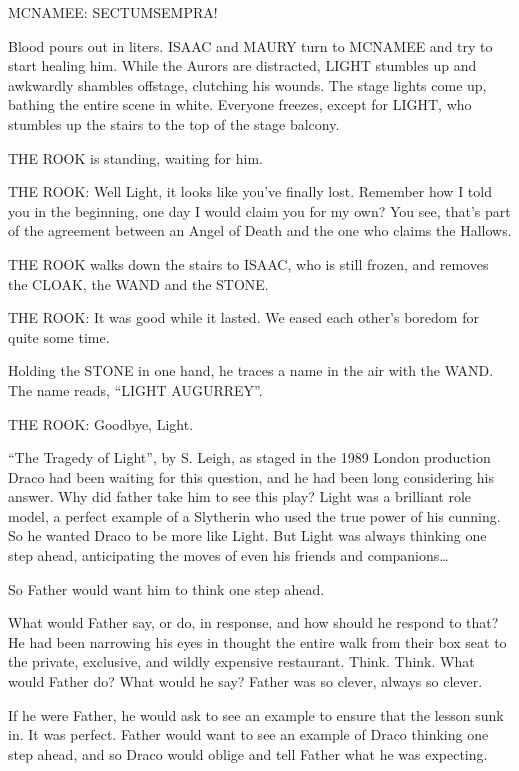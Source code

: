 MCNAMEE: SECTUMSEMPRA!

Blood pours out in liters. ISAAC and MAURY turn to MCNAMEE and try to start healing him. While the Aurors are distracted, LIGHT stumbles up and awkwardly shambles offstage, clutching his wounds. The stage lights come up, bathing the entire scene in white. Everyone freezes, except for LIGHT, who stumbles up the stairs to the top of the stage balcony.

THE ROOK is standing, waiting for him.

THE ROOK: Well Light, it looks like you’ve finally lost. Remember how I told you in the beginning, one day I would claim you for my own? You see, that’s part of the agreement between an Angel of Death and the one who claims the Hallows.

THE ROOK walks down the stairs to ISAAC, who is still frozen, and removes the CLOAK, the WAND and the STONE.

THE ROOK: It was good while it lasted. We eased each other’s boredom for quite some time.

Holding the STONE in one hand, he traces a name in the air with the WAND. The name reads, “LIGHT AUGURREY”.

THE ROOK: Goodbye, Light.

“The Tragedy of Light”, by S. Leigh, as staged in the 1989 London production
\simpleline
{}
Draco had been waiting for this question, and he had been long considering his answer. Why did father take him to see this play? Light was a brilliant role model, a perfect example of a Slytherin who used the true power of his cunning. So he wanted Draco to be more like Light. But Light was always thinking one step ahead, anticipating the moves of even his friends and companions…

So Father would want him to think one step ahead.

What would Father say, or do, in response, and how should he respond to that? He had been narrowing his eyes in thought the entire walk from their box seat to the private, exclusive, and wildly expensive restaurant. Think. Think. What would Father do? What would he say? Father was so clever, always so clever.

If he were Father, he would ask to see an example to ensure that the lesson sunk in. It was perfect. Father would want to see an example of Draco thinking one step ahead, and so Draco would oblige and tell Father what he was expecting.

